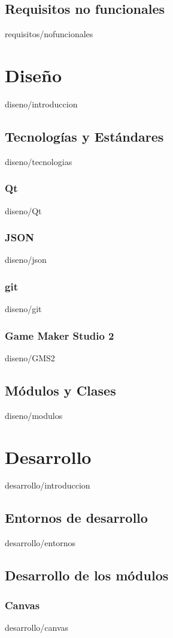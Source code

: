 \documentclass[epsbased,copyright,final,printable,covers,extendedindex,firstnumbered,tfg,gnuplot]{tfgtfmthesisuam}
\begin{document}
	\section{Requisitos no funcionales\label{SEC:REQUISITOSNOFUNCIONALES}}{requisitos/nofuncionales} %
	
\chapter{Diseño\label{CAP:DISENO}}{diseno/introduccion} %
	\section{Tecnologías y Estándares\label{SEC:TECNOLOGIAS}}{diseno/tecnologias} %
		\subsection{Qt\label{SUBSEC:QT}}{diseno/Qt}
		\subsection{JSON\label{SUBSEC:JSON}}{diseno/json}
		\subsection{git\label{SUBSEC:GIT}}{diseno/git}
		\subsection{Game Maker Studio 2\label{SUBSEC:GMS2}}{diseno/GMS2}
	\section{Módulos y Clases\label{SEC:MODULOS}}{diseno/modulos} %

\chapter{Desarrollo\label{CAP:DESARROLLO}}{desarrollo/introduccion}
	\section{Entornos de desarrollo\label{SEC:ENTORNOS}}{desarrollo/entornos}
	\section{Desarrollo de los módulos\label{SEC:DEVMODULOS}}
		\subsection{Canvas\label{SUBSEC:DEVCANVAS}}{desarrollo/canvas}
\end{document}

